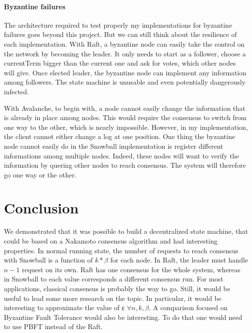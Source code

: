 \documentclass[11pt, twocolumn]{article}
\begin{document}
\paragraph{Byzantine failures}
The architecture required to test properly my implementations for byzantine failures goes beyond this project. But we can still think about the resilience of each implementation.
With Raft, a byzantine node can easily take the control on the network by becoming the leader. It only needs to start as a follower, choose a currentTerm bigger than the current one and ask for votes, which other nodes will give.
Once elected leader, the byzantine node can implement any information among followers. The state machine is unusable and even potentially dangerously infected.

With Avalanche, to begin with, a node cannot easily change the information that is already in place among nodes. This would require the consensus to switch from one way to the other, which is nearly impossible. However, in my implementation, the client cannot either change a log at one position.
One thing the byzantine node cannot easily do in the Snowball implementation is register different informations among multiple nodes. Indeed, these nodes will want to verify the information by quering other nodes to reach consensus. The system will therefore go one way or the other.

\section{Conclusion}

We demonstrated that it was possible to build a decentralized state machine, that could be based on a Nakamoto consensus algorithm and had interesting properties. 
In normal running state, the number of requests to reach consensus with Snowball is a function of $k * \beta$ for each node. In Raft, the leader must handle $n-1$ request on its own. 
Raft has one consensus for the whole system, whereas in Snowball to each value corresponds a different consensus run. For most applications, classical consensus is probably the way to go. Still, it would be useful to lead some more research on the topic. 
In particular, it would be interesting to approximate the value of ε $\forall n, k, \beta$. 
A comparison focused on Byzantine Fault Tolerance would also be interesting. To do that one would need to use PBFT \cite{pbft} instead of the Raft.

\onecolumn
\end{document}
